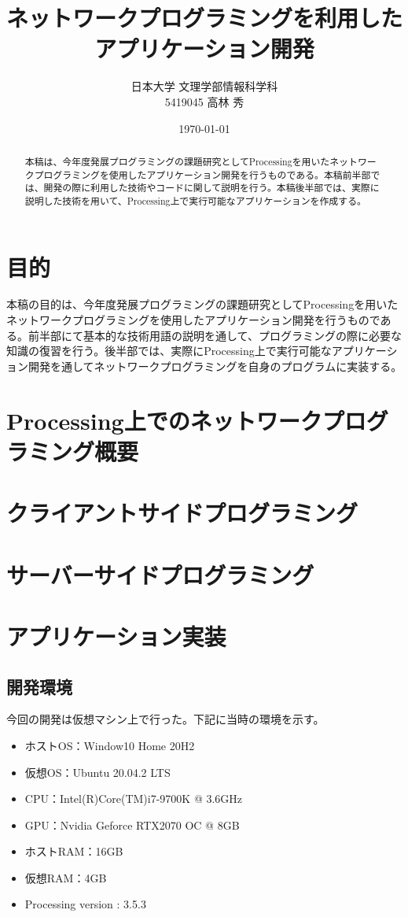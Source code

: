 \documentclass[dvipdfmx]{jsarticle}
\title{ネットワークプログラミングを利用したアプリケーション開発}
\date{\today}
\author{日本大学 文理学部情報科学科\\5419045 高林 秀}
\begin{document}
\maketitle

\begin{abstract}
本稿は、今年度発展プログラミングの課題研究としてProcessingを用いたネットワークプログラミングを使用したアプリケーション開発を行うものである。本稿前半部では、開発の際に利用した技術やコードに関して説明を行う。本稿後半部では、実際に説明した技術を用いて、Processing上で実行可能なアプリケーションを作成する。
\end{abstract}

\tableofcontents

\section{目的}
本稿の目的は、今年度発展プログラミングの課題研究としてProcessingを用いたネットワークプログラミングを使用したアプリケーション開発を行うものである。前半部にて基本的な技術用語の説明を通して、プログラミングの際に必要な知識の復習を行う。後半部では、実際にProcessing上で実行可能なアプリケーション開発を通してネットワークプログラミングを自身のプログラムに実装する。
\section{Processing上でのネットワークプログラミング概要}
\section{クライアントサイドプログラミング}
\section{サーバーサイドプログラミング}
\section{アプリケーション実装}
\subsection{開発環境}
今回の開発は仮想マシン上で行った。下記に当時の環境を示す。
\begin{itemize}
  \item ホストOS：Window10 Home 20H2
  \item 仮想OS：Ubuntu 20.04.2 LTS
  \item CPU：Intel(R)Core(TM)i7-9700K @ 3.6GHz
  \item GPU：Nvidia Geforce RTX2070 OC @ 8GB
  \item ホストRAM：16GB
  \item 仮想RAM：4GB
  \item Processing version : 3.5.3
\end{itemize}
\end{document}
